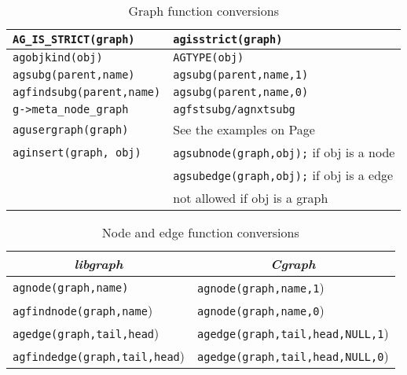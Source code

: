 \documentclass[11pt,letterpaper]{article}
\begin{document}
\begin{savenotes}
\begin{table*}[htb]
\begin{tabular}{|l|l|}
\verb"AG_IS_STRICT(graph)" &  \verb"agisstrict(graph)"  \\ \hline
\verb"agobjkind(obj)" &  \verb"AGTYPE(obj)" \\ \hline
\verb"agsubg(parent,name)"      &   \verb"agsubg(parent,name,1)" \\ \hline
\verb"agfindsubg(parent,name)"      &   \verb"agsubg(parent,name,0)" \\ \hline
\verb"g->meta_node_graph"            &  \verb"agfstsubg/agnxtsubg" \\
\verb"agusergraph(graph)"  &  See the examples on Page~\pageref{subg}\\ \hline
\verb"aginsert(graph, obj)" &  \verb"agsubnode(graph,obj);" if obj is a node \\
                      &  \verb"agsubedge(graph,obj);" if obj is a edge \\
                      & not allowed if obj is a graph \\ \hline
\end{tabular}
\caption{Graph function conversions}
\label{table:libgraph:g}
\end{table*}

\begin{table*}[ht]
\centering
\begin{tabular}{|l|l|} \hline
\multicolumn{1}{|c|}{\em libgraph} & \multicolumn{1}{c|}{\em Cgraph} \\ \hline
\verb"agnode(graph,name)" & \verb"agnode(graph,name,1") \\ \hline
\verb"agfindnode(graph,name") & \verb"agnode(graph,name,0") \\ \hline
\verb"agedge(graph,tail,head") & \verb"agedge(graph,tail,head,NULL,1") \\ \hline
\verb"agfindedge(graph,tail,head") & \verb"agedge(graph,tail,head,NULL,0") \\ \hline
\end{tabular}
\caption{Node and edge function conversions}
\label{table:libgraph:n}
\end{table*}


\end{savenotes}
\end{document}
